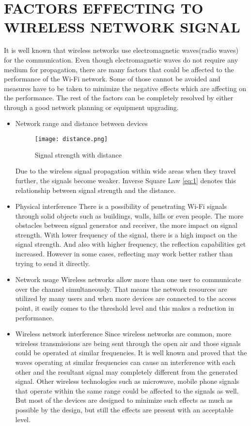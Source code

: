 \section{FACTORS EFFECTING TO WIRELESS NETWORK SIGNAL}
It is well known that wireless networks use electromagnetic waves(radio waves) for the communication. Even though electromagnetic waves do not require any medium for propagation, there are many factors that could be affected to the performance of the Wi-Fi network. Some of those cannot be avoided and measures have to be taken to minimize the negative effects which are affecting on the performance. The rest of the factors can be completely resolved by either through a good network planning or equipment upgrading.\cite{signal_probs}
\begin{itemize}
	\item Network range and distance between devices
	
	\begin{figure*}[h]	
		\centering
		\texttt{[image: distance.png]}
		\caption{Signal strength with distance}
	\end{figure*}
	
	\subitem  Due to the wireless signal propagation within wide areas when they travel further, the signals become weaker. Inverse Square Law \eqref{eq:1} denotes this relationship between signal strength and the distance.
	
	\item Physical interference
	\subitem There is a possibility of penetrating Wi-Fi signals through solid objects such as buildings, walls, hills or even people. The more obstacles between signal generator and receiver, the more impact on signal strength. With lower frequency of the signal, there is a high impact on the signal strength. And also with higher frequency, the reflection capabilities get increased. However in some cases, reflecting may work better rather than trying to send it directly.
	
	\item Network usage
	\subitem Wireless networks allow more than one user to communicate over the channel simultaneously. That means the network resources are utilized by many users and when more devices are connected to the access point, it easily comes to the threshold level and this makes a reduction in performance.
	
	\item Wireless network interference
	\subitem Since wireless networks are common, more wireless transmissions are being sent through the open air and those signals could be operated at similar frequencies. It is well known and proved that the waves operating at similar frequencies can cause an interference with each other and the resultant signal may completely different from the generated signal. Other wireless technologies such as microwave, mobile phone signals that operate within the same range could be affected to the signals as well. But most of the devices are designed to minimize such effects as much as possible by the design, but still the effects are present with an acceptable level.
	

\end{itemize}
